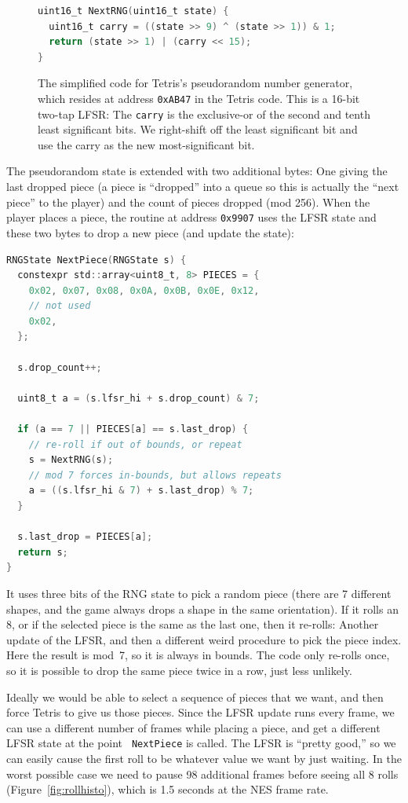 \documentclass[twocolumn]{article}
\begin{document}
\begin{figure}
  \begin{lstlisting}[language=C]
uint16_t NextRNG(uint16_t state) {
  uint16_t carry = ((state >> 9) ^ (state >> 1)) & 1;
  return (state >> 1) | (carry << 15);
}
  \end{lstlisting}
  \caption { The simplified code for Tetris's pseudorandom number
    generator, which resides at address {\tt 0xAB47} in the Tetris
    code. This is a 16-bit two-tap LFSR: The {\tt carry} is the
    exclusive-or of the second and tenth least significant bits. We
    right-shift off the least significant bit and use the carry as the
    new most-significant bit.} \label{fig:nextrng}
\end{figure}

The pseudorandom state is extended with two additional bytes: One
giving the last dropped piece (a piece is ``dropped'' into a queue so
this is actually the ``next piece'' to the player) and the count of
pieces dropped (mod 256). When the player places a piece, the routine
at address {\tt 0x9907} uses the LFSR state and these two bytes to
drop a new piece (and update the state):

\begin{lstlisting}[language=C]
RNGState NextPiece(RNGState s) {
  constexpr std::array<uint8_t, 8> PIECES = {
    0x02, 0x07, 0x08, 0x0A, 0x0B, 0x0E, 0x12,
    // not used
    0x02,
  };

  s.drop_count++;

  uint8_t a = (s.lfsr_hi + s.drop_count) & 7;

  if (a == 7 || PIECES[a] == s.last_drop) {
    // re-roll if out of bounds, or repeat
    s = NextRNG(s);
    // mod 7 forces in-bounds, but allows repeats
    a = ((s.lfsr_hi & 7) + s.last_drop) % 7;
  }
  
  s.last_drop = PIECES[a];
  return s;
}
\end{lstlisting}

It uses three bits of the RNG state to pick a random piece (there are
7 different shapes, and the game always drops a shape in the same
orientation). If it rolls an 8, or if the selected piece is the same
as the last one, then it re-rolls: Another update of the LFSR, and
then a different weird procedure to pick the piece index. Here the
result is {\sf mod}~7, so it is always in bounds. The code only
re-rolls once, so it is possible to drop the same piece twice in
a row, just less unlikely.

Ideally we would be able to select a sequence of pieces that we want,
and then force Tetris to give us those pieces. Since the LFSR update
runs every frame, we can use a different number of frames while
placing a piece, and get a different LFSR state at the point {\tt
  NextPiece} is called. The LFSR is ``pretty good,'' so we can easily
cause the first roll to be whatever value we want by just waiting. In
the worst possible case we need to pause 98 additional frames before
seeing all 8 rolls (Figure~\ref{fig:rollhisto}), which is 1.5 seconds
at the NES frame rate.
\end{document}
